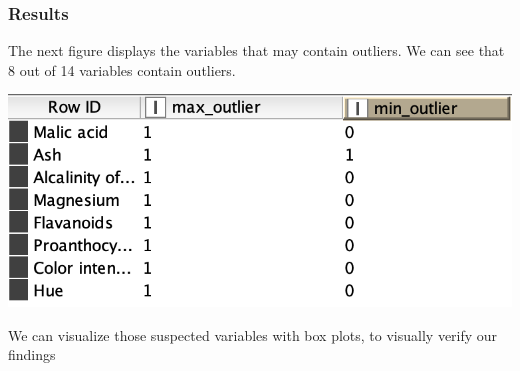 \documentclass[11pt]{article}
\begin{document}
			\subsubsection*{Results}
				The next figure displays the variables that may contain outliers. We can see that 8 out of 14 variables contain outliers. 
				\iftrue
				\begin{center}
					\includegraphics[scale=0.5]{res/t0/t03/t03-results}
				\end{center}
				\fi
				We can visualize those suspected variables with box plots, to visually verify our findings
				\iftrue
\end{document}
